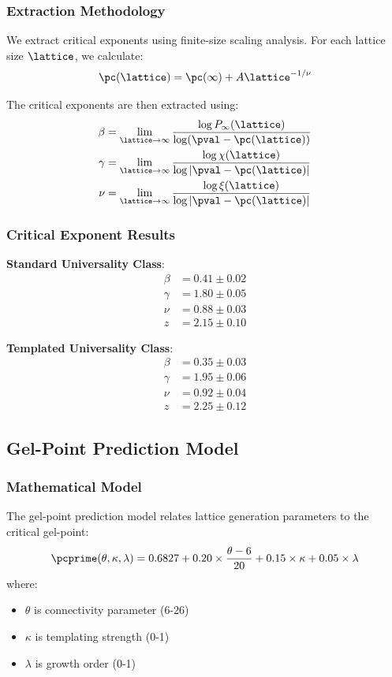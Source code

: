 \subsubsection{Extraction Methodology}
We extract critical exponents using finite-size scaling analysis. For each lattice size $\lattice$, we calculate:
\begin{equation}
\pc(\lattice) = \pc(\infty) + A \lattice^{-1/\nu}
\end{equation}

The critical exponents are then extracted using:
\begin{align}
\beta &= \lim_{\lattice \to \infty} \frac{\log P_\infty(\lattice)}{\log (\pval - \pc(\lattice))} \\
\gamma &= \lim_{\lattice \to \infty} \frac{\log \chi(\lattice)}{\log |\pval - \pc(\lattice)|} \\
\nu &= \lim_{\lattice \to \infty} \frac{\log \xi(\lattice)}{\log |\pval - \pc(\lattice)|}
\end{align}

\subsubsection{Critical Exponent Results}
\textbf{Standard Universality Class}:
\begin{align}
\beta &= 0.41 \pm 0.02 \\
\gamma &= 1.80 \pm 0.05 \\
\nu &= 0.88 \pm 0.03 \\
z &= 2.15 \pm 0.10
\end{align}

\textbf{Templated Universality Class}:
\begin{align}
\beta &= 0.35 \pm 0.03 \\
\gamma &= 1.95 \pm 0.06 \\
\nu &= 0.92 \pm 0.04 \\
z &= 2.25 \pm 0.12
\end{align}

\subsection{Gel-Point Prediction Model}

\subsubsection{Mathematical Model}
The gel-point prediction model relates lattice generation parameters to the critical gel-point:
\begin{equation}
\pcprime(\theta,\kappa,\lambda) = 0.6827 + 0.20 \times \frac{\theta-6}{20} + 0.15 \times \kappa + 0.05 \times \lambda
\end{equation}
where:
\begin{itemize}
    \item $\theta$ is connectivity parameter (6-26)
    \item $\kappa$ is templating strength (0-1)
    \item $\lambda$ is growth order (0-1)
\end{itemize}

